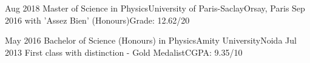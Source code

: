 %
%
%






\begin{experiences}
  \experience
    {Aug 2018}   {Master of Science in Physics}{University of Paris-Saclay}{Orsay, Paris}
    {Sep 2016} {with 'Assez Bien' (Honours)}{Grade: 12.62/20}
   \emptySeparator





\experience
   {May 2016}   {Bachelor of Science (Honours) in Physics}{Amity University}{Noida}
    {Jul 2013} {First class with distinction - Gold Medalist}{CGPA: 9.35/10}

\end{experiences}